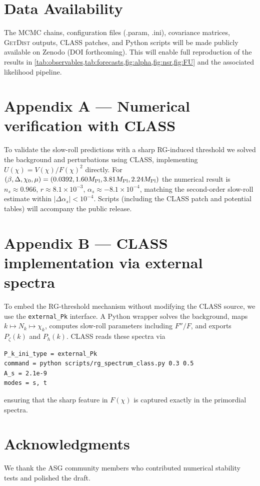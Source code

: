 \documentclass[11pt,a4paper]{article}
\begin{document}
\section{Data Availability}
\label{sec:data}
The MCMC chains, configuration files (.param, .ini), covariance matrices, \textsc{GetDist} outputs, \textsc{CLASS} patches, and Python scripts will be made publicly available on Zenodo (DOI forthcoming). This will enable full reproduction of the results in \cref{tab:observables,tab:forecasts,fig:alpha,fig:nsr,fig:FU} and the associated likelihood pipeline.

\appendix

\section{Appendix A --- Numerical verification with CLASS}
To validate the slow-roll predictions with a sharp RG-induced threshold we solved the background and perturbations using \textsc{CLASS}, implementing $U(\chi)=V(\chi)/F(\chi)^{2}$ directly. For $(\beta,\Delta,\chi_{0},\mu)=(0.0392,1.60M_{\rm Pl},3.81M_{\rm Pl},2.24M_{\rm Pl})$ the numerical result is $n_{s}\approx0.966$, $r\approx8.1\times10^{-3}$, $\alpha_{s}\approx-8.1\times10^{-4}$, matching the second-order slow-roll estimate within $|\Delta\alpha_{s}|<10^{-4}$. Scripts (including the \textsc{CLASS} patch and potential tables) will accompany the public release.

\section{Appendix B --- CLASS implementation via external spectra}
To embed the RG-threshold mechanism without modifying the \textsc{CLASS} source, we use the \texttt{external\_Pk} interface. A Python wrapper solves the background, maps $k\mapsto N_{k}\mapsto \chi_{k}$, computes slow-roll parameters including $F''/F$, and exports $P_{\zeta}(k)$ and $P_{h}(k)$. \textsc{CLASS} reads these spectra via
\begin{verbatim}
P_k_ini_type = external_Pk
command = python scripts/rg_spectrum_class.py 0.3 0.5
A_s = 2.1e-9
modes = s, t
\end{verbatim}
ensuring that the sharp feature in $F(\chi)$ is captured exactly in the primordial spectra.

\section*{Acknowledgments}
We thank the ASG community members who contributed numerical stability tests and polished the draft.
\end{document}
